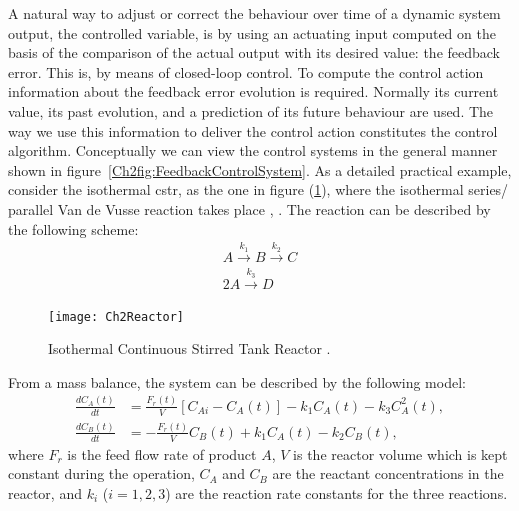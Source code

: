 A natural way to adjust or correct the behaviour over time of a dynamic system output, the controlled variable, is by using an actuating input computed on the basis of the comparison of the actual output with its desired value: the feedback error. This is, by means of closed-loop control. To compute the control action information about the feedback error evolution is required. Normally its current value, its past evolution, and a prediction of its future behaviour are used. The way we use this information to deliver the control action constitutes the control algorithm. Conceptually we can view the control systems in the general manner shown in figure~\ref{Ch2fig:FeedbackControlSystem}. As a detailed  practical example, consider the isothermal \gls{cstr}, as the one in figure (\ref{Ch2fig:CSTR}), where the isothermal series/ parallel Van de Vusse reaction takes place \citep{arrietaETFA2008}, \citep{VandeVusse2} . The reaction can be described by the following scheme:
%
\begin{align}
    A \overset{k_1}{\longrightarrow} B \overset{k_2}{\longrightarrow}C\\
    2 A \overset{k_3}{\longrightarrow} D \nonumber
\end{align}
%
%
\begin{figure}[t]
	\centering
	\texttt{[image: Ch2Reactor]}
	\caption{Isothermal Continuous Stirred Tank Reactor .} 
	\label{Ch2fig:CSTR}
\end{figure}

From a mass balance, the system can be described by the following model:
%
\begin{align}
    \frac{dC_A(t)}{dt} & = \frac{F_r(t)}{V} \left[C_{Ai}-C_A(t)\right] - k_1 C_A(t) - k_3 C^2_A(t),\nonumber \\
    \frac{dC_B(t)}{dt} & = -\frac{F_r(t)}{V} C_B(t)+ k_1 C_A(t) - k_2 C_B(t),
    \label{Ch2eq:system3}
\end{align}
%
where $F_r$ is the feed flow rate of product $A$, $V$ is the reactor volume which is kept constant during the operation, $C_A$ and $C_B$ are the reactant concentrations in the reactor, and $k_i$ ($i=1,2,3$) are the reaction rate constants for the three reactions.

